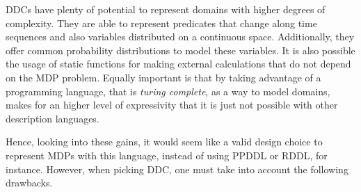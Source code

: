 \glspl{DDC} have plenty of potential to represent domains with higher degrees
of complexity. They are able to represent predicates that change along time
sequences and also variables distributed on a continuous space. Additionally,
they offer common probability distributions to model these variables. It is also
possible the usage of static functions for making external calculations that do
not depend on the \gls{MDP} problem. Equally important is that by taking
advantage of a programming language, that is \textit{turing complete}, as a way
to model domains, makes for an higher level of expressivity that it is just not
possible with other description languages.

Hence, looking into these gains, it would seem like a valid design choice to
represent \glspl{MDP} with this language, instead of using PPDDL or RDDL, for
instance. However, when picking \gls{DDC}, one must take into account the
following drawbacks.
